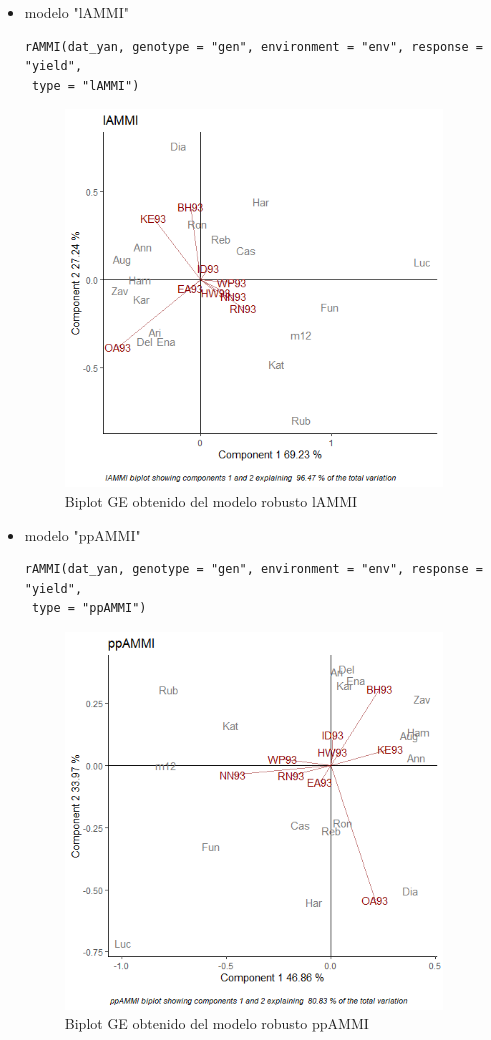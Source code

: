 \begin{itemize}
\item  modelo "lAMMI"

\begin{lstlisting}
rAMMI(dat_yan, genotype = "gen", environment = "env", response = "yield",
 type = "lAMMI")
\end{lstlisting}


\begin{figure}[h!]
	\begin{center}
		\includegraphics[width=10cm]{./Graficos/lAMMI.png}
	\end{center}
	\caption{Biplot GE obtenido del modelo robusto lAMMI}
\end{figure}


\item  modelo "ppAMMI"
\begin{lstlisting}
rAMMI(dat_yan, genotype = "gen", environment = "env", response = "yield",
 type = "ppAMMI")
\end{lstlisting}


\begin{figure}[h!]
	\begin{center}
		\includegraphics[width=10cm]{./Graficos/ppAMMI.png}
	\end{center}
	\caption{Biplot GE obtenido del modelo robusto ppAMMI}
\end{figure}

\end{itemize}

